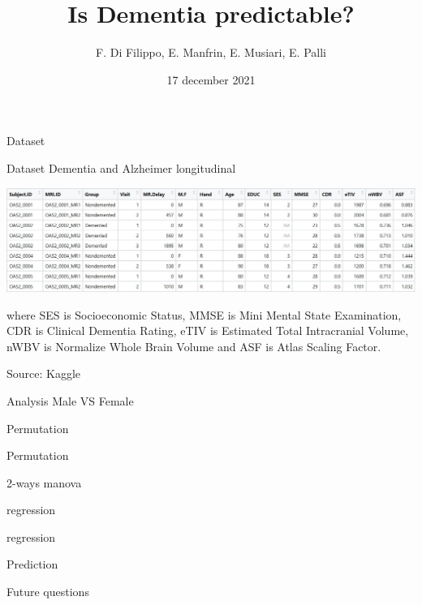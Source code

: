 \documentclass{beamer}
\title{Is Dementia predictable?}
\author{F. Di Filippo, E. Manfrin, E. Musiari, E. Palli}
\date{17 december 2021}
\begin{document}
\begin{frame}
\maketitle
\end{frame}


\begin{frame}{Dataset}

Dataset Dementia and Alzheimer longitudinal
\begin{center}
	
	
	\includegraphics[width=\columnwidth]{dataset_al.jpeg}
\end{center}


where SES is Socioeconomic Status, MMSE is Mini Mental State Examination, CDR is Clinical Dementia Rating, eTIV is Estimated Total Intracranial Volume, nWBV is Normalize Whole Brain Volume and ASF is Atlas Scaling Factor.

\vspace{0.1 cm}
Source: Kaggle


\end{frame}

\begin{frame}{Analysis Male VS Female}
	
\end{frame}


\begin{frame}{Permutation}

\end{frame}

\begin{frame}{Permutation}

\end{frame}

\begin{frame}{2-ways manova}

\end{frame}

\begin{frame}{regression}

\end{frame}

\begin{frame}{regression}

\end{frame}

\begin{frame}{Prediction}

\end{frame}

\begin{frame}{Future questions}

\end{frame}
\end{document}
